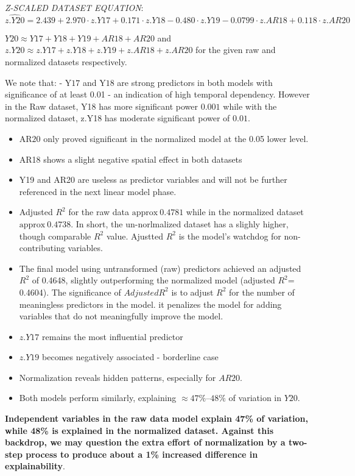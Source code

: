 \documentclass[
]{article}
\begin{document}
\emph{Z-SCALED DATASET EQUATION}: \[
\hat{z.Y20} = 2.439 + 2.970 \cdot z.Y17 + 0.171 \cdot z.Y18 - 0.480 \cdot z.Y19 - 0.0799 \cdot z.AR18 + 0.118 \cdot z.AR20
\]

\(Y20 \approx Y17 + Y18 + Y19 + AR18 + AR20\) and
\(z.Y20 \approx z.Y17 + z.Y18 + z.Y19 + z.AR18 + z.AR20\) for the given
raw and normalized datasets respectively.

We note that: - \(\text{Y17}\) and \(\text{Y18}\) are strong predictors
in both models with significance of at least 0.01 - an indication of
high temporal dependency. However in the Raw dataset, Y18 has more
significant power \(0.001\) while with the normalized dataset, z.Y18 has
moderate significant power of \(0.01\).

\begin{itemize}
\item
  \(\text{AR20}\) only proved significant in the normalized model at the
  0.05 lower level.
\item
  AR18 shows a slight negative spatial effect in both datasets
\item
  Y19 and AR20 are useless as predictor variables and will not be
  further referenced in the next linear model phase.
\item
  Adjusted \(R^2\) for the raw data \(\text{approx}\ 0.4781\) while in
  the normalized dataset \(\text{approx}\ 0.4738\). In short, the
  un-norlmalized dataset has a slighly higher, though comparable \(R^2\)
  value. Ajustted \(R^2\) is the model's watchdog for non-contributing
  variables.
\item
  The final model using untransformed (raw) predictors achieved an
  adjusted \(R^2\) of 0.4648, slightly outperforming the normalized
  model (adjusted \(R^2\)= 0.4604). The significance of \(Adjusted R^2\)
  is to adjust \(R^2\) for the number of meaningless predictors in the
  model. it penalizes the model for adding variables that do not
  meaningfully improve the model.
\item
  \(z.Y17\) remains the most influential predictor
\item
  \(z.Y19\) becomes negatively associated - borderline case
\item
  Normalization reveals hidden patterns, especially for \(AR20\).
\item
  Both models perform similarly, explaining \(\approx 47\%\text{–}48\%\)
  of variation in \(Y20\).
\end{itemize}

\textbf{Independent variables in the raw data model explain 47\% of
variation, while 48\% is explained in the normalized dataset. Against
this backdrop, we may question the extra effort of normalization by a
two-step process to produce about a 1\% increased difference in
explainability}.
\end{document}
